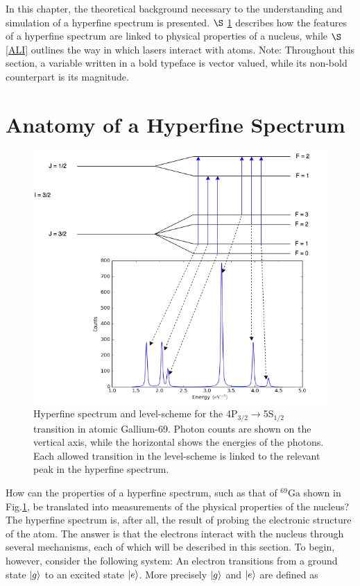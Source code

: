 In this chapter, the theoretical background necessary to the understanding and simulation of a hyperfine spectrum is presented. $\S$ \ref{AHF} describes how the features of a hyperfine spectrum are linked to physical properties of a nucleus, while $\S$ \ref{ALI} outlines the way in which lasers interact with atoms.
Note: Throughout this section, a variable written in a bold typeface is vector valued, while its non-bold counterpart is its magnitude. 
\section{Anatomy of a Hyperfine Spectrum}
\label{AHF}
\begin{figure}[h]
\includegraphics[width=\textwidth]{Graphics/spec_with_peaks_4.png}
\caption[Hyperfine spectrum and level-scheme for Gallium-69.]{Hyperfine spectrum and level-scheme for the 4P$_{3/2}\rightarrow$5S$_{1/2}$ transition in atomic Gallium-69. Photon counts are shown on the vertical axis, while the horizontal shows the energies of the photons. Each allowed transition in the level-scheme is linked to the relevant peak in the hyperfine spectrum.}
\label{ga69}
\end{figure}
How can the properties of a hyperfine spectrum, such as that of $^{69}\mathrm{Ga}$ shown in Fig.\ref{ga69}, be translated into measurements of the physical properties of the nucleus? The hyperfine spectrum is, after all, the result of probing the electronic structure of the atom. The answer is that the electrons interact with the nucleus through several mechanisms, each of which will be described in this section. To begin, however, consider the following system: An electron transitions from a ground state $\ket{g}$ to an excited state $\ket{e}$. More precisely $\ket{g}$ and $\ket{e}$ are defined as 
